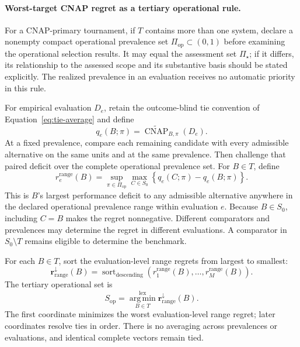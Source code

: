\documentclass[11pt]{article}
\newcommand{\CNAP}{\operatorname{CNAP}}
\newcommand{\PSet}{\Pi_\star}
\newcommand{\CNAPta}{\widetilde{\CNAP}}
\theoremstyle{remark}
\begin{document}
\paragraph{Worst-target CNAP regret as a tertiary operational rule.}
For a CNAP-primary tournament, if $T$ contains more than one system, declare a nonempty compact operational
prevalence set $\Pi_{\mathrm{op}}\subset(0,1)$ before examining the operational
selection results. It may equal the assessment set $\PSet$; if it differs, its
relationship to the assessed scope and its substantive basis should be stated
explicitly. The realized prevalence in an evaluation receives no automatic
priority in this rule.

For empirical evaluation $D_e$, retain the outcome-blind tie convention of
Equation~\eqref{eq:tie-average} and define
\begin{equation}
q_e(B;\pi)
=
\CNAPta_{B,\pi}(D_e).
\label{eq:operational-cnap-profile}
\end{equation}
At a fixed prevalence, compare each remaining candidate with every admissible
alternative on the same units and at the same prevalence. Then challenge that
paired deficit over the complete operational prevalence set. For $B\in T$,
define
\begin{equation}
r_e^{\mathrm{range}}(B)
=
\sup_{\pi\in\Pi_{\mathrm{op}}}
\max_{C\in S_0}
\left\{
q_e(C;\pi)-q_e(B;\pi)
\right\}.
\label{eq:range-cnap-regret}
\end{equation}
This is $B$'s largest performance deficit to any admissible alternative
anywhere in the declared operational prevalence range within evaluation $e$.
Because $B\in S_0$, including $C=B$ makes the regret nonnegative. Different
comparators and prevalences may determine the regret in different evaluations.
A comparator in $S_0\setminus T$ remains eligible to determine the benchmark.

For each $B\in T$, sort the evaluation-level range regrets from largest to
smallest:
\begin{equation}
\mathbf r_{\mathrm{range}}^{\downarrow}(B)
=
\operatorname{sort}_{\mathrm{descending}}
\left(
r_1^{\mathrm{range}}(B),\ldots,r_M^{\mathrm{range}}(B)
\right).
\label{eq:range-cnap-regret-vector}
\end{equation}
The tertiary operational set is
\begin{equation}
S_{\mathrm{op}}
=
\operatorname*{arg\,min}^{\mathrm{lex}}_{B\in T}
\mathbf r_{\mathrm{range}}^{\downarrow}(B).
\label{eq:range-cnap-selection}
\end{equation}
The first coordinate minimizes the worst evaluation-level range regret; later
coordinates resolve ties in order. There is no averaging across prevalences or
evaluations, and identical complete vectors remain tied.
\end{document}
